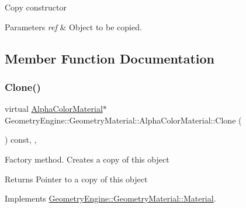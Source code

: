 Copy constructor 
\begin{DoxyParams}{Parameters}
{\em ref} & Object to be copied. \\
\hline
\end{DoxyParams}


\subsection{Member Function Documentation}
\mbox{\label{class_geometry_engine_1_1_geometry_material_1_1_alpha_color_material_a932e340f71f7afd3088a44c29560744c}} 
\subsubsection{\texorpdfstring{Clone()}{Clone()}}
{\footnotesize\ttfamily virtual \mbox{\hyperlink{class_geometry_engine_1_1_geometry_material_1_1_alpha_color_material}{Alpha\+Color\+Material}}$\ast$ Geometry\+Engine\+::\+Geometry\+Material\+::\+Alpha\+Color\+Material\+::\+Clone (\begin{DoxyParamCaption}{ }\end{DoxyParamCaption}) const\hspace{0.3cm}{\ttfamily [inline]}, {\ttfamily [override]}, {\ttfamily [virtual]}}

Factory method. Creates a copy of this object \begin{DoxyReturn}{Returns}
Pointer to a copy of this object 
\end{DoxyReturn}


Implements \mbox{\hyperlink{class_geometry_engine_1_1_geometry_material_1_1_material_ae5513ff06d536365e18ddc5e07e79784}{Geometry\+Engine\+::\+Geometry\+Material\+::\+Material}}.

\mbox{\label{class_geometry_engine_1_1_geometry_material_1_1_alpha_color_material_a59728843668ee81b42a908d143a23754}} 
